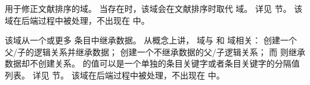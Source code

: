 \begin{fieldlist}



用于修正文献排序的域。
当存在时，该域会在文献排序时取代  域。
详见  节。
该域在后端过程中被处理，不出现在  中。




该域从一个或更多  条目中继承数据。
从概念上讲， 域与  和  域相关：
 创建一个父/子的逻辑关系并继承数据；
 创建一个不继承数据的父/子逻辑关系；
而  则继承数据却不创建关系。
 的值可以是一个单独的条目关键字或者条目关键字的分隔值列表。
详见  节。
该域在后端过程中被处理，不出现在  中。




\end{fieldlist}
